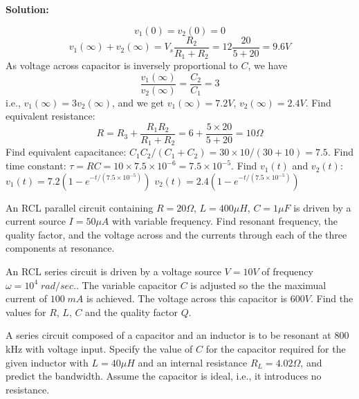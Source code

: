 \begin{enumerate}
 {\bf Solution:}
 
  \[ v_1(0)=v_2(0)=0	\]
  \[ v_1(\infty)+v_2(\infty)=V_s \frac{R_2}{R_1+R_2}
  	=12 \frac{20}{5+20}=9.6V	\]
  As voltage across capacitor is inversely proportional to $C$, we have
  \[	\frac{v_1(\infty)}{v_2(\infty)}=\frac{C_2}{C_1}=3	\]
  i.e., $v_1(\infty)=3v_2(\infty)$, and we get $v_1(\infty)=7.2V$,
  $v_2(\infty)=2.4V$.
  Find equivalent resistance: 
  \[ R=R_3+\frac{R_1 R_2}{R_1+R_2}=6+\frac{5\times 20}{5+20}=10\Omega \]
  Find equivalent capacitance: $C_1 C_2/(C_1+C_2)=30\times 10/(30+10)=7.5$. 
  Find time constant: $\tau=RC=10\times 7.5\times 10^{-6}=7.5\times 10^{-5}$.
  Find $v_1(t)$ and $v_2(t)$:
  $v_1(t)=7.2(1-e^{-t/(7.5\times 10^{-5})})$
  $v_2(t)=2.4(1-e^{-t/(7.5\times 10^{-5})})$

\end{enumerate}


\item An RCL parallel circuit containing $R=20\Omega$, $L=400 \mu H$,
$C=1 \mu F$ is driven by a current source $I=50 \mu A$ with variable 
frequency. Find resonant frequency, the quality factor, and the voltage
across and the currents through each of the three components at resonance.

% 
 
 
\item An RCL series circuit is driven by a voltage source $V=10V$ of
frequency $\omega=10^4 \;rad/sec.$. The variable capacitor $C$ is
adjusted so the the maximual current of $100\;mA$ is achieved. The
voltage across this capacitor is $600V$. Find the values for $R$, $L$,
$C$ and the quality factor $Q$.

% 


\item A series circuit composed of a capacitor and an inductor is to be 
resonant at 800 kHz with voltage input. Specify the value of $C$ for the 
capacitor required for the given inductor with $L=40\mu H$ and an internal 
resistance $R_L=4.02\Omega$, and predict the bandwidth. Assume the capacitor 
is ideal, i.e., it introduces no resistance.


